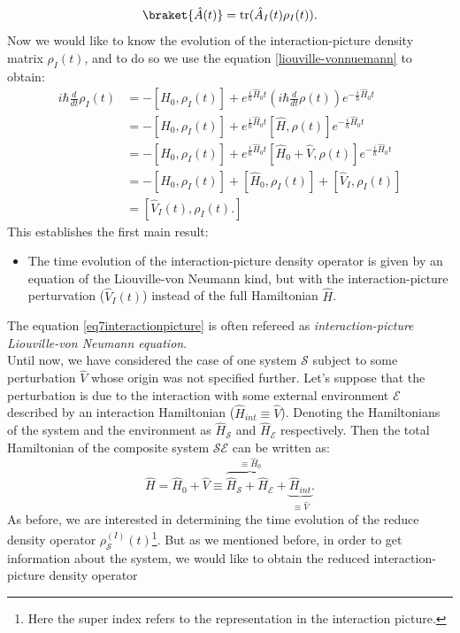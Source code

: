 \begin{appendix}
\begin{equation}
\braket{\hat{A}(t)}=\text{tr}(\hat{A}_I(t)\rho_I(t)).
\label{eq6interactionpicture}
\end{equation}
Now we would like to know the evolution of the interaction-picture density matrix $\rho_I(t)$, and to do so we use the equation \eqref{liouville-vonnuemann} to obtain:
\begin{align}
i\hbar\frac{d}{dt}\rho_I(t)&=-[\hat{H}_0,\rho_I(t)]+e^{\frac{i}{\hbar}\hat{H}_0t}\left(i\hbar\frac{d}{dt}\rho(t)\right)e^{-\frac{i}{\hbar}\hat{H}_0t}\nonumber\\
&=-[\hat{H}_0,\rho_I(t)]+e^{\frac{i}{\hbar}\hat{H}_0t}[\hat{H},\rho(t)]e^{-\frac{i}{\hbar}\hat{H}_0t}\nonumber\\
&=-[\hat{H}_0,\rho_I(t)]+e^{\frac{i}{\hbar}\hat{H}_0t}[\hat{H}_0+\hat{V},\rho(t)]e^{-\frac{i}{\hbar}\hat{H}_0t}\nonumber\\
&=-[\hat{H}_0,\rho_I(t)]+[\hat{H}_0,\rho_I(t)]+[\hat{V}_I,\rho_I(t)]\nonumber\\
&=[\hat{V}_I(t),\rho_I(t).]
\label{eq7interactionpicture}
\end{align}
This establishes the first main result:
\begin{itemize}
\item The time evolution of the interaction-picture density operator is given by an equation of the Liouville-von Neumann kind, but with the interaction-picture perturvation ($\hat{V}_I(t)$) instead of the full Hamiltonian $\hat{H}$.
\end{itemize}
 The equation \eqref{eq7interactionpicture} is often refereed as \textit{interaction-picture Liouville-von Neumann equation}.\\
Until now, we have considered the case of one system $\mathcal{S}$ subject to some perturbation $\hat{V}$ whose origin was not specified further. Let's suppose that the perturbation is due to the interaction with some external environment $\mathcal{E}$ described by an interaction Hamiltonian ($\hat{H}_{int}\equiv \hat{V}$). Denoting the Hamiltonians of the system and the environment as $\hat{H}_{\mathcal{S}}$ and $\hat{H}_{\mathcal{E}}$ respectively. Then the total Hamiltonian of the composite system $\mathcal{SE}$ can be written as:
\[
\hat{H}=\hat{H}_0+\hat{V}\equiv\overbrace{\hat{H}_{\mathcal{S}}+\hat{H}_{\mathcal{E}}}^{\equiv\hat{H}_0}+\underbrace{\hat{H}_{int}}_{\equiv \hat{V}}.
\] 
As before, we are interested in determining the time evolution of the reduce density operator $\rho_{\mathcal{S}}^{(I)}(t)$\footnote{Here the super index refers to the representation in the interaction picture.}. But as we mentioned before, in order to get information about the system, we would like to obtain the reduced interaction-picture density operator

\end{appendix}
